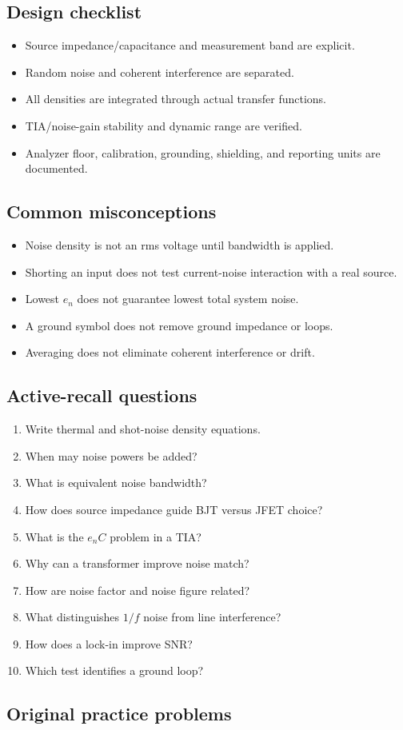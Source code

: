 \documentclass[10pt,letterpaper]{article}
\begin{document}
\subsection{Design checklist}
\begin{itemize}
  \item Source impedance/capacitance and measurement band are explicit.
  \item Random noise and coherent interference are separated.
  \item All densities are integrated through actual transfer functions.
  \item TIA/noise-gain stability and dynamic range are verified.
  \item Analyzer floor, calibration, grounding, shielding, and reporting units are documented.
\end{itemize}\subsection{Common misconceptions}
\begin{itemize}
  \item Noise density is not an rms voltage until bandwidth is applied.
  \item Shorting an input does not test current-noise interaction with a real source.
  \item Lowest $e_n$ does not guarantee lowest total system noise.
  \item A ground symbol does not remove ground impedance or loops.
  \item Averaging does not eliminate coherent interference or drift.
\end{itemize}\subsection{Active-recall questions}
\begin{enumerate}
  \item Write thermal and shot-noise density equations.
  \item When may noise powers be added?
  \item What is equivalent noise bandwidth?
  \item How does source impedance guide BJT versus JFET choice?
  \item What is the $e_nC$ problem in a TIA?
  \item Why can a transformer improve noise match?
  \item How are noise factor and noise figure related?
  \item What distinguishes $1/f$ noise from line interference?
  \item How does a lock-in improve SNR?
  \item Which test identifies a ground loop?
\end{enumerate}\subsection{Original practice problems}
\end{document}
